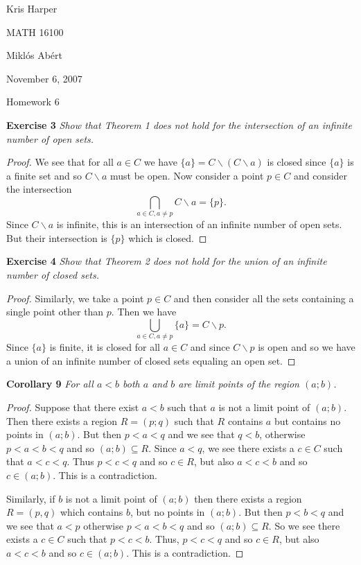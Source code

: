 \documentclass{article}
\begin{document}
\begin{flushright}
Kris Harper

MATH 16100

Mikl\'{o}s Ab\'{e}rt

November 6, 2007
\end{flushright}

\begin{center}
Homework 6
\end{center}

\begin{flushleft}

\textbf{Exercise 3}
\textsl{Show that Theorem 1 does not hold for the intersection of an infinite number of open sets.}
\begin{proof}
We see that for all $a \in C$ we have $\{a\}=C \backslash (C \backslash a)$ is closed since $\{a\}$ is a finite set and so $C \backslash a$ must be open. Now consider a point $p \in C$ and consider the intersection
\[
\bigcap_{a \in C, a \neq p} C \backslash a = \{p\}.
\]
Since $C \backslash a$ is infinite, this is an intersection of an infinite number of open sets. But their intersection is $\{p\}$ which is closed.
\end{proof}

\textbf{Exercise 4}
\textsl{Show that Theorem 2 does not hold for the union of an infinite number of closed sets.}
\begin{proof}
Similarly, we take a point $p \in C$ and then consider all the sets containing a single point other than $p$. Then we have
\[
\bigcup_{a \in C, a \neq p} \{a\} = C \backslash p.
\]
Since $\{a\}$ is finite, it is closed for all $a \in C$ and since $C \backslash p$ is open and so we have a union of an infinite number of closed sets equaling an open set.
\end{proof}

\textbf{Corollary 9}
\textsl{For all $a<b$ both $a$ and $b$ are limit points of the region $(a;b)$.}
\begin{proof}
Suppose that there exist $a<b$ such that $a$ is not a limit point of $(a;b)$. Then there exists a region $R=(p;q)$ such that $R$ contains $a$ but contains no points in $(a;b)$. But then $p<a<q$ and we see that $q<b$, otherwise $p<a<b<q$ and so $(a;b) \subseteq R$. Since $a<q$, we see there exists a $c \in C$ such that $a<c<q$. Thus $p<c<q$ and so $c \in R$, but also $a<c<b$ and so $c \in (a;b)$. This is a contradiction.\newline

Similarly, if $b$ is not a limit point of $(a;b)$ then there exists a region $R=(p,q)$ which contains $b$, but no points in $(a;b)$. But then $p<b<q$ and we see that $a<p$ otherwise $p<a<b<q$ and so $(a;b) \subseteq R$. So we see there exists a $c \in C$ such that $p<c<b$. Thus, $p<c<q$ and so $c \in R$, but also $a<c<b$ and so $c \in (a;b)$. This is a contradiction.
\end{proof}


\end{flushleft}
\end{document}

